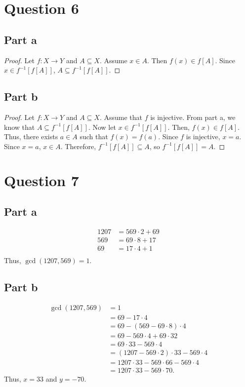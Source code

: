 \documentclass{article}
\begin{document}
\section*{Question 6}

\subsection*{Part a}
\begin{proof}
    Let $f: X \to Y$ and $A \subseteq X$.
    Assume $x \in A$.
    Then $f(x) \in f[A]$.
    Since $x \in f^{-1}[f[A]]$, $A \subseteq f^{-1}[f[A]]$.
\end{proof}

\subsection*{Part b}
\begin{proof}
    Let $f: X \to Y$ and $A \subseteq X$.
    Assume that $f$ is injective.
    From part a, we know that $A \subseteq f^{-1}[f[A]]$.
    Now let $x \in f^{-1}[f[A]]$.
    Then, $f(x) \in f[A]$.
    Thus, there exists $a \in A$ such that $f(x) = f(a)$.
    Since $f$ is injective, $x = a$.
    Since $x = a$, $x \in A$.
    Therefore, $f^{-1}[f[A]] \subseteq A$, so $f^{-1}[f[A]] = A$.
\end{proof}

\section*{Question 7}

\subsection*{Part a}
\begin{align*}
    1207 &= 569 \cdot 2 + 69 \\
    569 &= 69 \cdot 8 + 17 \\
    69 &= 17 \cdot 4 + 1 \\
\end{align*}
Thus, $\gcd(1207, 569) = 1$.

\subsection*{Part b}
\begin{align*}
    \gcd(1207, 569) &= 1 \\
    &= 69 - 17 \cdot 4 \\
    &= 69 - (569 - 69 \cdot 8) \cdot 4 \\
    &= 69 - 569 \cdot 4 + 69 \cdot 32 \\
    &= 69 \cdot 33 - 569 \cdot 4 \\
    &= (1207 - 569 \cdot 2) \cdot 33 - 569 \cdot 4 \\
    &= 1207 \cdot 33 - 569 \cdot 66 - 569 \cdot 4 \\
    &= 1207 \cdot 33 - 569 \cdot 70.
\end{align*}
Thus, $x = 33$ and $y = -70$.
\end{document}
